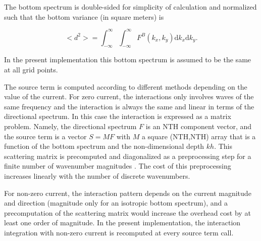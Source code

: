 The bottom spectrum is double-sided for simplicity of calculation
and normalized such that the bottom variance (in square meters) is

\begin{equation}
<d^2> =\int_{-\infty}^{\infty} \int_{-\infty}^{\infty}
F^B(k_x,k_y)  {\mathrm d} k_x  {\mathrm d} k_y.
\end{equation}

\noindent
In the present implementation this bottom spectrum is assumed to be the same
at all grid points.
 
The source term is computed according to different methods depending on the
value of the current. For zero current, the interactions only involves waves
of the same frequency and the interaction is always the same and linear in
terms of the directional spectrum. In this case the interaction is expressed
as a matrix problem. Namely, the directional spectrum $F$ is an {\F NTH} component vector, 
and the source term is a vector $S = M F$ with $M$ a square ({\F NTH,NTH}) array that is 
a function of the bottom spectrum and the non-dimensional depth $kh$.  This 
scattering matrix is precomputed and diagonalized as a
preprocessing step for a finite number of wavenumber magnitudes
\citep{art:AH02}.  The cost of this preprocessing increases linearly with the
number of discrete wavenumbers.

For non-zero current, the interaction pattern depends on the current magnitude
and direction (magnitude only for an isotropic bottom spectrum), and a precomputation of 
the scattering matrix would increase the overhead cost by at least one order of magnitude. In the
present implementation, the interaction integration with non-zero current is recomputed at every
source term call.
